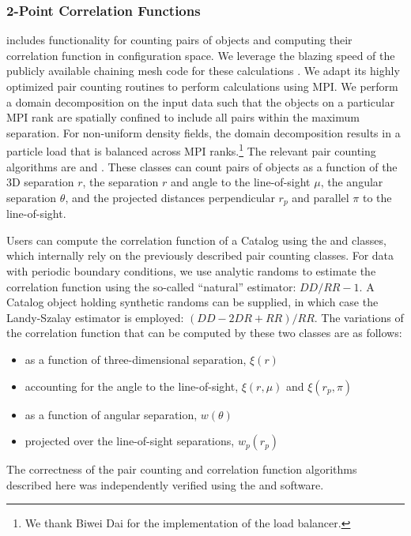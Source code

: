 \subsubsection{2-Point Correlation Functions}

\nbkit{} includes functionality for counting pairs of objects and computing
their correlation function in configuration space. We leverage the
blazing speed of the publicly available \Corrfunc{} chaining mesh code for
these calculations \citep{Sinha:2017}. We adapt its
highly optimized pair counting routines to perform calculations using MPI.
We perform a domain decomposition on the input data such that the objects
on a particular MPI rank are spatially confined to include all pairs within
the maximum separation. For non-uniform density fields,
the domain decomposition results in a particle load that
is balanced across MPI ranks.\footnote{We thank Biwei Dai for the implementation of the load balancer.}
The relevant pair counting algorithms
are  and . These
classes can count pairs of objects as a function of the 3D separation $r$,
the separation $r$ and angle to the line-of-sight $\mu$, the angular
separation $\theta$, and the projected distances perpendicular $r_p$ and
parallel $\pi$ to the line-of-sight.

Users can compute the correlation function of a Catalog using the
 and  classes, which internally
rely on the previously described pair counting classes. For data
with periodic boundary conditions, we use analytic randoms to estimate
the correlation function using the so-called ``natural'' estimator:
$DD/RR - 1$. A Catalog object holding synthetic randoms can be supplied,
in which case the Landy-Szalay estimator \citep{Landy:1993}
is employed: $(DD - 2 DR + RR)/RR$. The variations of the correlation
function that can be computed by these two classes are as follows:
\begin{itemize}
  \item as a function of three-dimensional separation, $\xi(r)$
  \item accounting for the angle to the line-of-sight, $\xi(r, \mu)$ and $\xi(r_p, \pi)$
  \item as a function of angular separation, $w(\theta)$
  \item projected over the line-of-sight separations,  $w_p(r_p)$
\end{itemize}
The correctness of the pair counting and correlation function algorithms
described here was independently verified using the \kdcount{} and
\halotools{} software.

